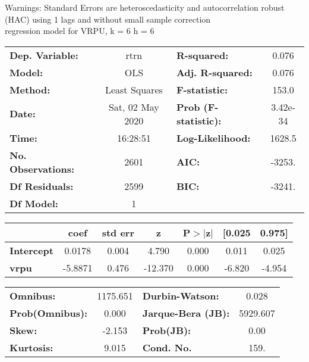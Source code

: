Warnings: \newline
 [1] Standard Errors are heteroscedasticity and autocorrelation robust (HAC) using 1 lags and without small sample correction\\ 

regression model for VRPU, k = 6 h = 6\begin{center}
\begin{tabular}{lclc}
\toprule
\textbf{Dep. Variable:}    &       rtrn       & \textbf{  R-squared:         } &     0.076   \\
\textbf{Model:}            &       OLS        & \textbf{  Adj. R-squared:    } &     0.076   \\
\textbf{Method:}           &  Least Squares   & \textbf{  F-statistic:       } &     153.0   \\
\textbf{Date:}             & Sat, 02 May 2020 & \textbf{  Prob (F-statistic):} &  3.42e-34   \\
\textbf{Time:}             &     16:28:51     & \textbf{  Log-Likelihood:    } &    1628.5   \\
\textbf{No. Observations:} &        2601      & \textbf{  AIC:               } &    -3253.   \\
\textbf{Df Residuals:}     &        2599      & \textbf{  BIC:               } &    -3241.   \\
\textbf{Df Model:}         &           1      & \textbf{                     } &             \\
\bottomrule
\end{tabular}
\begin{tabular}{lcccccc}
                   & \textbf{coef} & \textbf{std err} & \textbf{z} & \textbf{P$> |$z$|$} & \textbf{[0.025} & \textbf{0.975]}  \\
\midrule
\textbf{Intercept} &       0.0178  &        0.004     &     4.790  &         0.000        &        0.011    &        0.025     \\
\textbf{vrpu}      &      -5.8871  &        0.476     &   -12.370  &         0.000        &       -6.820    &       -4.954     \\
\bottomrule
\end{tabular}
\begin{tabular}{lclc}
\textbf{Omnibus:}       & 1175.651 & \textbf{  Durbin-Watson:     } &    0.028  \\
\textbf{Prob(Omnibus):} &   0.000  & \textbf{  Jarque-Bera (JB):  } & 5929.607  \\
\textbf{Skew:}          &  -2.153  & \textbf{  Prob(JB):          } &     0.00  \\
\textbf{Kurtosis:}      &   9.015  & \textbf{  Cond. No.          } &     159.  \\
\bottomrule
\end{tabular}
\end{center}

